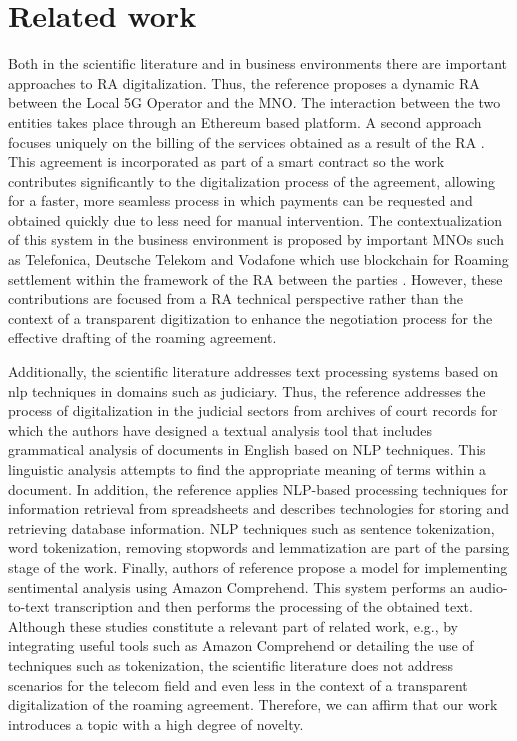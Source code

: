 \documentclass[conference]{style/IEEEtran}
\begin{document}
\section{Related work}

Both in the scientific literature and in business environments there are important approaches to RA digitalization. Thus, the reference \cite{9369516} proposes a dynamic RA between the Local 5G Operator and the MNO. The interaction between the two entities takes place through an Ethereum based platform. A second approach focuses uniquely on the billing of the services obtained as a result of the RA \cite{9024541}. This agreement is incorporated as part of a smart contract so the work contributes significantly to the digitalization process of the agreement, allowing for a faster, more seamless process in which payments can be requested and obtained quickly due to less need for manual intervention. The contextualization of this system in the business environment is proposed by important MNOs such as Telefonica, Deutsche Telekom and Vodafone which use blockchain for Roaming settlement within the framework of the RA between the parties \cite{Huillet2020}. However, these contributions are focused from a RA technical perspective rather than the context of a transparent digitization to enhance the negotiation process for the effective drafting of the roaming agreement. 

Additionally, the scientific literature addresses text processing systems based on nlp techniques in domains such as judiciary. Thus, the reference \cite{8487847} addresses the process of digitalization in the judicial sectors from archives of court records for which the authors have designed a textual analysis tool that includes grammatical analysis of documents in English based on NLP techniques. This linguistic analysis attempts to find the appropriate meaning of terms within a document. In addition, the reference \cite{9138070} applies NLP-based processing techniques for information retrieval from spreadsheets and describes technologies for storing and retrieving database information. NLP techniques such as sentence tokenization, word tokenization, removing stopwords and lemmatization are part of the parsing stage of the work. Finally, authors of reference \cite{9104105} propose a model for implementing sentimental analysis using Amazon Comprehend. This system performs an audio-to-text transcription and then performs the processing of the obtained text. Although these studies  constitute a relevant part of related work, e.g., by integrating useful tools such as Amazon Comprehend or detailing the use of techniques such as tokenization, the scientific literature does not address scenarios for the telecom field and even less in the context of a transparent digitalization of the roaming agreement. Therefore, we can affirm that our work introduces a topic with a high degree of novelty.
\end{document}
